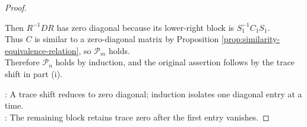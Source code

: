 \begin{theorem}
\begin{proof}
\begin{enumerate}[label=(\roman*)]
Then $R^{-1}DR$ has zero diagonal because its lower-right block is $S_1^{-1}C_1S_1$.\\
Thus $C$ is similar to a zero-diagonal matrix by Proposition \ref{prop:similarity-equivalence-relation}, so $\mathcal{P}_m$ holds.\\
Therefore $\mathcal{P}_n$ holds by induction, and the original assertion follows by the trace shift in part (i).
\end{enumerate}
: A trace shift reduces to zero diagonal; induction isolates one diagonal entry at a time.\\
: The remaining block retains trace zero after the first entry vanishes.
\end{proof}
\end{theorem}

